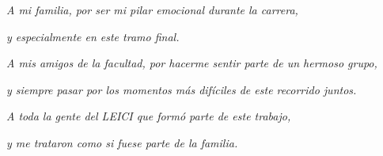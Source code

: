 \begin{flushright}
\emph{A mi familia, por ser mi pilar emocional durante la carrera,} \par \emph{y especialmente en este tramo final.}\par
\medskip
\emph{A mis amigos de la facultad, por hacerme sentir parte de un hermoso grupo,}\par\emph{y siempre pasar por los momentos más difíciles de este recorrido juntos.}\par
\medskip
\emph{A toda la gente del LEICI que formó parte de este trabajo,} \par \emph{y me trataron como si fuese parte de la familia.}\par

\end{flushright}

\newpage